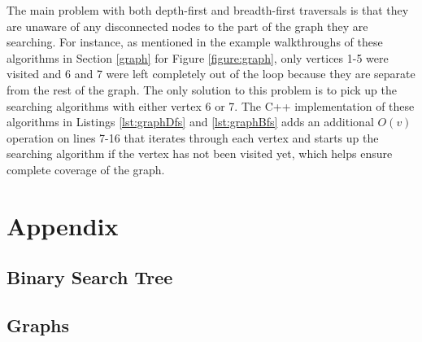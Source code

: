 \documentclass[letterpaper, 10pt,DIV=13]{scrartcl}
\numberwithin{equation}{section} %
\numberwithin{figure}{section} %
\numberwithin{table}{section} %
\begin{document}
The main problem with both depth-first and breadth-first traversals is that they are unaware of any disconnected nodes to the part of the graph they are searching. For instance, as mentioned in the example walkthroughs of these algorithms in Section \ref{graph} for Figure \ref{figure:graph}, only vertices 1-5 were visited and 6 and 7 were left completely out of the loop because they are separate from the rest of the graph. The only solution to this problem is to pick up the searching algorithms with either vertex 6 or 7. The C++ implementation of these algorithms in Listings \ref{lst:graphDfs} and \ref{lst:graphBfs} adds an additional $O(v)$ operation on lines 7-16 that iterates through each vertex and starts up the searching algorithm if the vertex has not been visited yet, which helps ensure complete coverage of the graph.


\lstset{numbers=left, numberstyle=\tiny, stepnumber=1, numbersep=5pt}


\section{Appendix}
\subsection{Binary Search Tree}


\subsection{Graphs}



\end{document}
